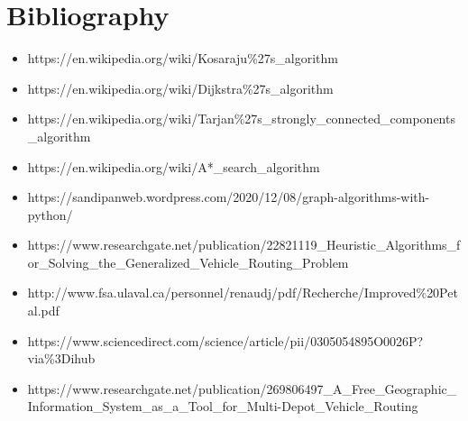\documentclass{article}
\begin{document}
\section{Bibliography}
\begin{itemize}
    \item https://en.wikipedia.org/wiki/Kosaraju\%27s\_algorithm
    \item https://en.wikipedia.org/wiki/Dijkstra\%27s\_algorithm
    \item https://en.wikipedia.org/wiki/Tarjan\%27s\_strongly\_connected\_components\_algorithm
    \item https://en.wikipedia.org/wiki/A*\_search\_algorithm
    \item https://sandipanweb.wordpress.com/2020/12/08/graph-algorithms-with-python/
    \item https://www.researchgate.net/publication/22821119\_Heuristic\_Algorithms\_for\_Solving\_the\_Generalized\_Vehicle\_Routing\_Problem
    \item http://www.fsa.ulaval.ca/personnel/renaudj/pdf/Recherche/Improved\%20Petal.pdf
    \item https://www.sciencedirect.com/science/article/pii/0305054895O0026P?via\%3Dihub 
    \item https://www.researchgate.net/publication/269806497\_A\_Free\_Geographic\_Information\_System\_as\_a\_Tool\_for\_Multi-Depot\_Vehicle\_Routing
\end{itemize}
\end{document}
